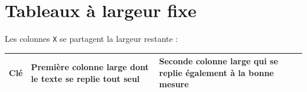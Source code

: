 \documentclass{article}
\begin{document}
\hsize=380pt
\section{Tableaux \`a largeur fixe}
Les colonnes \texttt{X} se partagent la largeur restante :
\begin{tabularx}{\hsize}{|l|X|X|}
\hline
Cl\'e & Premi\`ere colonne large dont le texte se replie tout seul & Seconde colonne large qui se replie \'egalement \`a la bonne mesure \\
\hline
\end{tabularx}
\end{document}
